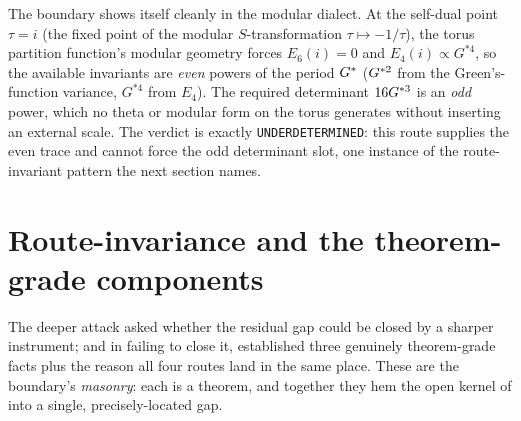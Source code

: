  The boundary shows itself cleanly
in the modular dialect. At the self-dual point $\tau=i$ (the fixed point of the
modular $S$-transformation $\tau\mapsto-1/\tau$), the torus partition function's
modular geometry forces $E_6(i)=0$ and $E_4(i)\propto G^{*4}$, so the available
invariants are \emph{even} powers of the period $G^{*}$ ($G^{*2}$ from the
Green's-function variance, $G^{*4}$ from $E_4$). The required determinant
$16G^{*3}$ is an \emph{odd} power, which no theta or modular form on the torus
generates without inserting an external scale. The verdict is exactly
\texttt{UNDERDETERMINED}: this route supplies the even trace and cannot force the
odd determinant slot, one instance of the route-invariant pattern the next
section names.

\section{Route-invariance and the theorem-grade components}\label{sec:routeinv}
The deeper attack asked whether the residual gap could be closed by a sharper
instrument; and in failing to close it, established three genuinely
theorem-grade facts plus the reason all four routes land in the same place. These
are the boundary's \emph{masonry}: each is a theorem, and together they hem the
open kernel of  into a single, precisely-located gap.

